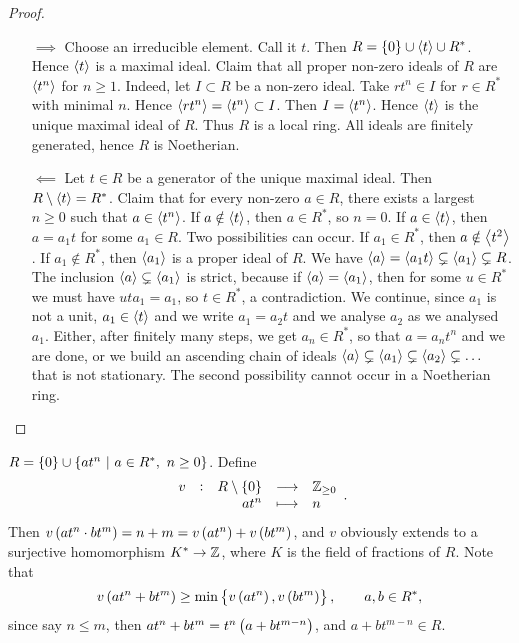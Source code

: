 \begin{proof}
\hfill
\begin{itemize}
\item[$ \implies $] Choose an irreducible element. Call it $ t $. Then $ R = \cbr{0} \cup \abr{t} \cup R^* $. Hence $ \left\langle t \right\rangle $ is a maximal ideal. Claim that all proper non-zero ideals of $ R $ are $ \left\langle t^n \right\rangle $ for $ n \ge 1 $. Indeed, let $ I \subset R $ be a non-zero ideal. Take $ rt^n \in I $ for $ r \in R^* $ with minimal $ n $. Hence $ \left\langle rt^n \right\rangle = \left\langle t^n \right\rangle \subset I $. Then $ I = \left\langle t^n \right\rangle $. Hence $ \left\langle t \right\rangle $ is the unique maximal ideal of $ R $. Thus $ R $ is a local ring. All ideals are finitely generated, hence $ R $ is Noetherian.


\item[$ \impliedby $] Let $ t \in R $ be a generator of the unique maximal ideal. Then $ R \setminus \left\langle t \right\rangle = R^* $. Claim that for every non-zero $ a \in R $, there exists a largest $ n \ge 0 $ such that $ a \in \left\langle t^n \right\rangle $. If $ a \notin \left\langle t \right\rangle $, then $ a \in R^* $, so $ n = 0 $. If $ a \in \left\langle t \right\rangle $, then $ a = a_1t $ for some $ a_1 \in R $. Two possibilities can occur. If $ a_1 \in R^* $, then $ a \notin \left\langle t^2 \right\rangle $. If $ a_1 \notin R^* $, then $ \left\langle a_1 \right\rangle $ is a proper ideal of $ R $. We have $ \left\langle a \right\rangle = \left\langle a_1t \right\rangle \subsetneq \left\langle a_1 \right\rangle \subsetneq R $. The inclusion $ \left\langle a \right\rangle \subsetneq \left\langle a_1 \right\rangle $ is strict, because if $ \left\langle a \right\rangle = \left\langle a_1 \right\rangle $, then for some $ u \in R^* $ we must have $ uta_1 = a_1 $, so $ t \in R^* $, a contradiction. We continue, since $ a_1 $ is not a unit, $ a_1 \in \left\langle t \right\rangle $ and we write $ a_1 = a_2t $ and we analyse $ a_2 $ as we analysed $ a_1 $. Either, after finitely many steps, we get $ a_n \in R^* $, so that $ a = a_nt^n $ and we are done, or we build an ascending chain of ideals $ \left\langle a \right\rangle \subsetneq \left\langle a_1 \right\rangle \subsetneq \left\langle a_2 \right\rangle \subsetneq \dots $ that is not stationary. The second possibility cannot occur in a Noetherian ring.
\end{itemize}
\end{proof}

\begin{remark*}
$ R = \cbr{0} \cup \cbr{at^n \st a \in R^*, \ n \ge 0} $. Define
$$ \function[v]{R \setminus \cbr{0}}{\ZZ_{\ge 0}}{at^n}{n}. $$
Then $ v\br{at^n \cdot bt^m} = n + m = v\br{at^n} + v\br{bt^m} $, and $ v $ obviously extends to a surjective homomorphism $ K^* \to \mathbb{Z} $, where $ K $ is the field of fractions of $ R $. Note that
$$ v\br{at^n + bt^m} \ge \min\cbr{v\br{at^n}, v\br{bt^m}}, \qquad a, b \in R^*, $$
since say $ n \le m $, then $ at^n + bt^m = t^n\br{a + bt^{m - n}} $, and $ a + bt^{m - n} \in R $.
\end{remark*}

